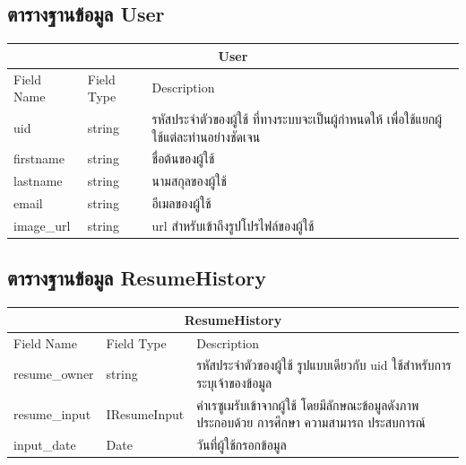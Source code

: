 \subsection{ตารางฐานข้อมูล User}
\begin{table}[H]
    \begin{tabular*}{\textwidth}{l|l|p{}}
        \hline
        \multicolumn{3}{c}{User}                                                                                                      \\ \hline
        Field Name  & Field Type & Description                                                                                        \\ \hline
        uid         & string     & รหัสประจำตัวของผู้ใช้ ที่ทางระบบจะเป็นผู้กำหนดให้ เพื่อใช้แยกผู้ใช้แต่ละท่านอย่างชัดเจน            \\
        firstname   & string     & ชื่อต้นของผู้ใช้                                                                                   \\
        lastname    & string     & นามสกุลของผู้ใช้                                                                                   \\
        email       & string     & อีเมลของผู้ใช้                                                                                     \\
        image\_url  & string     & url สำหรับเข้าถึงรูปโปรไฟล์ของผู้ใช้ \\ \hline
    \end{tabular*}
\end{table}

\subsection{ตารางฐานข้อมูล ResumeHistory}
\begin{table}[H]
    \begin{tabular*}{\textwidth}{l|l|p{}}
        \hline
        \multicolumn{3}{c}{ResumeHistory}                                                                   \\\hline
        Field Name    & Field Type & Description                                                            \\\hline
        resume\_owner & string     & รหัสประจำตัวของผู้ใช้ รูปแบบเดียวกับ uid ใช้สำหรับการระบุเจ้าของข้อมูล \\
        resume\_input   & IResumeInput     & ค่าเรซูเมรับเข้าจากผู้ใช้ โดยมีลักษณะข้อมูลดังภาพ ประกอบด้วย การศึกษา ความสามารถ ประสบการณ์ \\
        input\_date   & Date       & วันที่ผู้ใช้กรอกข้อมูล \\ \hline
    \end{tabular*}
\end{table}

